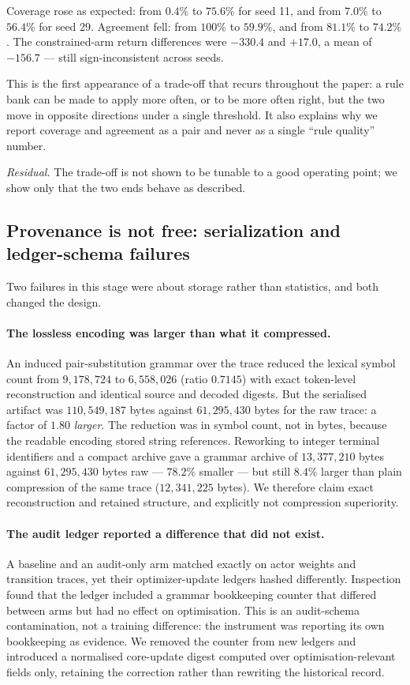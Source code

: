 \documentclass[11pt,a4paper]{article}
\begin{document}
Coverage rose as expected: from $0.4\%$ to $75.6\%$ for seed 11, and from $7.0\%$ to $56.4\%$ for seed 29. Agreement fell: from $100\%$ to $59.9\%$, and from $81.1\%$ to $74.2\%$. The constrained-arm return differences were $-330.4$ and $+17.0$, a mean of $-156.7$ --- still sign-inconsistent across seeds.

This is the first appearance of a trade-off that recurs throughout the paper: a rule bank can be made to apply more often, or to be more often right, but the two move in opposite directions under a single threshold. It also explains why we report coverage and agreement as a pair and never as a single ``rule quality'' number.

\emph{Residual.} The trade-off is not shown to be tunable to a good operating point; we show only that the two ends behave as described.

\subsection{Provenance is not free: serialization and ledger-schema failures}
\label{sec:hist-serialization}

Two failures in this stage were about storage rather than statistics, and both changed the design.

\paragraph{The lossless encoding was larger than what it compressed.}
An induced pair-substitution grammar over the trace reduced the lexical symbol count from $9{,}178{,}724$ to $6{,}558{,}026$ (ratio $0.7145$) with exact token-level reconstruction and identical source and decoded digests. But the serialised artifact was $110{,}549{,}187$ bytes against $61{,}295{,}430$ bytes for the raw trace: a factor of $1.80$ \emph{larger}. The reduction was in symbol count, not in bytes, because the readable encoding stored string references. Reworking to integer terminal identifiers and a compact archive gave a grammar archive of $13{,}377{,}210$ bytes against $61{,}295{,}430$ bytes raw --- $78.2\%$ smaller --- but still $8.4\%$ larger than plain compression of the same trace ($12{,}341{,}225$ bytes). We therefore claim exact reconstruction and retained structure, and explicitly not compression superiority.

\paragraph{The audit ledger reported a difference that did not exist.}
A baseline and an audit-only arm matched exactly on actor weights and transition traces, yet their optimizer-update ledgers hashed differently. Inspection found that the ledger included a grammar bookkeeping counter that differed between arms but had no effect on optimisation. This is an audit-schema contamination, not a training difference: the instrument was reporting its own bookkeeping as evidence. We removed the counter from new ledgers and introduced a normalised core-update digest computed over optimisation-relevant fields only, retaining the correction rather than rewriting the historical record.
\end{document}
